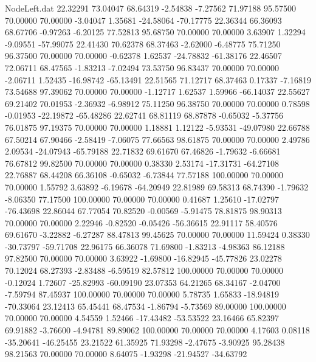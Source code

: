 \begin{filecontents}{NodeLeft.dat}
  22.32291   73.04047   68.64319    -2.54838   -7.27562   71.97188   95.57500   70.00000   70.00000   -3.04047    1.35681  -24.58064  -70.17775
  22.36344   66.36093   68.67706    -0.97263   -6.20125   77.52813   95.68750   70.00000   70.00000    3.63907    1.32294   -9.09551  -57.99075
  22.41430   70.62378   68.37463    -2.62000   -6.48775   75.71250   96.37500   70.00000   70.00000   -0.62378    1.62537  -24.78832  -61.38176
  22.46507   72.06711   68.47565    -1.83213   -7.02494   73.53750   96.83437   70.00000   70.00000   -2.06711    1.52435  -16.98742  -65.13491
  22.51565   71.12717   68.37463     0.17337   -7.16819   73.54688   97.39062   70.00000   70.00000   -1.12717    1.62537    1.59966  -66.14037
  22.55627   69.21402   70.01953    -2.36932   -6.98912   75.11250   96.38750   70.00000   70.00000    0.78598   -0.01953  -22.19872  -65.48286
  22.62741   68.81119   68.87878    -0.65032   -5.37756   76.01875   97.19375   70.00000   70.00000    1.18881    1.12122   -5.93531  -49.07980
  22.66788   67.50214   67.90466    -2.58419   -7.06075   77.66563   98.61875   70.00000   70.00000    2.49786    2.09534  -24.07943  -65.79188
  22.71832   69.61670   67.46826    -1.79632   -6.66681   76.67812   99.82500   70.00000   70.00000    0.38330    2.53174  -17.31731  -64.27108
  22.76887   68.44208   66.36108    -0.65032   -6.73844   77.57188  100.00000   70.00000   70.00000    1.55792    3.63892   -6.19678  -64.20949
  22.81989   69.58313   68.74390    -1.79632   -8.06350   77.17500  100.00000   70.00000   70.00000    0.41687    1.25610  -17.02797  -76.43698
  22.86044   67.77054   70.82520    -0.00569   -5.91475   78.81875   98.90313   70.00000   70.00000    2.22946   -0.82520   -0.05426  -56.36615
  22.91117   58.40576   69.61670    -3.22882   -6.27287   88.47813   99.45625   70.00000   70.00000   11.59424    0.38330  -30.73797  -59.71708
  22.96175   66.36078   71.69800    -1.83213   -4.98363   86.12188   97.82500   70.00000   70.00000    3.63922   -1.69800  -16.82945  -45.77826
  23.02278   70.12024   68.27393    -2.83488   -6.59519   82.57812  100.00000   70.00000   70.00000   -0.12024    1.72607  -25.82993  -60.09190
  23.07353   64.21265   68.34167    -2.04700   -7.59794   87.45937  100.00000   70.00000   70.00000    5.78735    1.65833  -18.94819  -70.33064
  23.12413   65.45441   68.47534    -1.86794   -5.73569   89.00000  100.00000   70.00000   70.00000    4.54559    1.52466  -17.43482  -53.53522
  23.16466   65.82397   69.91882    -3.76600   -4.94781   89.89062  100.00000   70.00000   70.00000    4.17603    0.08118  -35.20641  -46.25455
  23.21522   61.35925   71.93298    -2.47675   -3.90925   95.28438   98.21563   70.00000   70.00000    8.64075   -1.93298  -21.94527  -34.63792

\end{filecontents}
